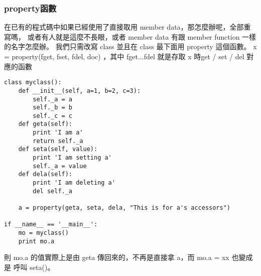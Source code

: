     \subsubsection{property函數}
    在已有的程式碼中如果已經使用了直接取用 member data，那怎麼辦呢，全部重寫嗎，
    或者有人就是這麼不長眼，或者 member data 有跟 member function 一樣的名字怎麼辦。
    我們只需改寫 class 並且在 class 最下面用 property 這個函數。
    x = property(fget, fset, fdel, doc) ，其中
    fget...fdel 就是存取 x 時get / set / del 對應的函數

\begin{verbatim}
class myclass():
    def __init__(self, a=1, b=2, c=3):
        self._a = a
        self._b = b
        self._c = c
    def geta(self):
        print 'I am a'
        return self._a
    def seta(self, value):
        print 'I am setting a'
        self._a = value
    def dela(self):
        print 'I am deleting a'
        del self._a
    
    a = property(geta, seta, dela, "This is for a's accessors")

if __name__ == '__main__':
    mo = myclass()
    print mo.a
\end{verbatim}
則 mo.a 的值實際上是由 geta 傳回來的，不再是直接拿 a，而 mo.a = xx 也變成是
呼叫 seta()。


